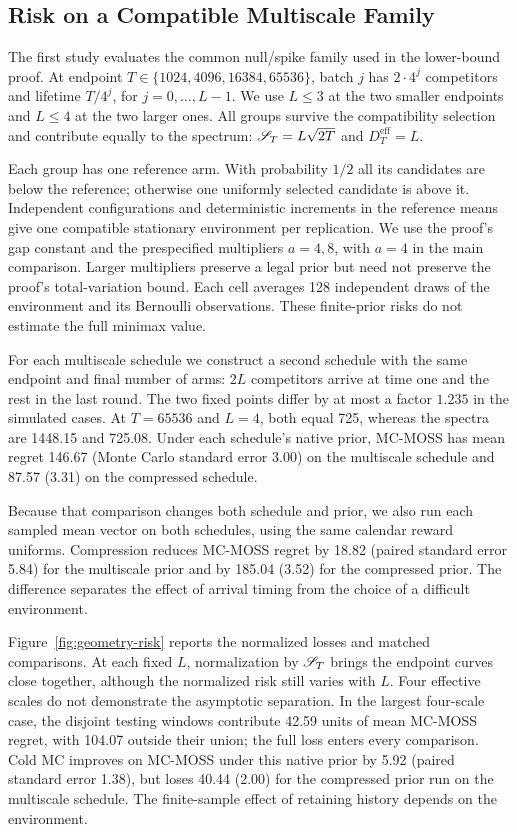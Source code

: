 \subsection{Risk on a Compatible Multiscale Family}\label{sec:geometry-experiment}
The first study evaluates the common null/spike family used in the lower-bound proof. At endpoint $T\in\{1024,4096,16384,65536\}$, batch $j$ has $2\cdot4^j$ competitors and lifetime $T/4^j$, for $j=0,\ldots,L-1$. We use $L\le3$ at the two smaller endpoints and $L\le4$ at the two larger ones. All groups survive the compatibility selection and contribute equally to the spectrum: $\mathscr S_T=L\sqrt{2T}$ and $D_T^{\mathrm{eff}}=L$.

Each group has one reference arm. With probability $1/2$ all its candidates are below the reference; otherwise one uniformly selected candidate is above it. Independent configurations and deterministic increments in the reference means give one compatible stationary environment per replication. We use the proof's gap constant and the prespecified multipliers $a=4,8$, with $a=4$ in the main comparison. Larger multipliers preserve a legal prior but need not preserve the proof's total-variation bound. Each cell averages 128 independent draws of the environment and its Bernoulli observations. These finite-prior risks do not estimate the full minimax value.

For each multiscale schedule we construct a second schedule with the same endpoint and final number of arms: $2L$ competitors arrive at time one and the rest in the last round. The two fixed points differ by at most a factor $1.235$ in the simulated cases. At $T=65536$ and $L=4$, both equal 725, whereas the spectra are 1448.15 and 725.08. Under each schedule's native prior, MC-MOSS has mean regret 146.67 (Monte Carlo standard error 3.00) on the multiscale schedule and 87.57 (3.31) on the compressed schedule.

Because that comparison changes both schedule and prior, we also run each sampled mean vector on both schedules, using the same calendar reward uniforms. Compression reduces MC-MOSS regret by 18.82 (paired standard error 5.84) for the multiscale prior and by 185.04 (3.52) for the compressed prior. The difference separates the effect of arrival timing from the choice of a difficult environment.

Figure~\ref{fig:geometry-risk} reports the normalized losses and matched comparisons. At each fixed $L$, normalization by $\mathscr S_T$ brings the endpoint curves close together, although the normalized risk still varies with $L$. Four effective scales do not demonstrate the asymptotic separation. In the largest four-scale case, the disjoint testing windows contribute 42.59 units of mean MC-MOSS regret, with 104.07 outside their union; the full loss enters every comparison. Cold MC improves on MC-MOSS under this native prior by 5.92 (paired standard error 1.38), but loses 40.44 (2.00) for the compressed prior run on the multiscale schedule. The finite-sample effect of retaining history depends on the environment.



